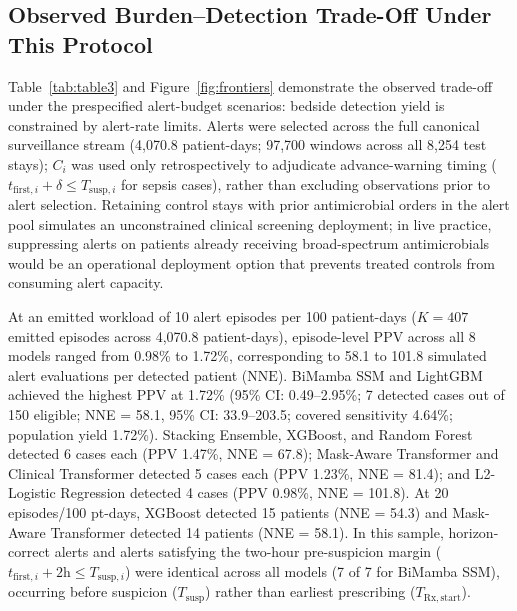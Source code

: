 \documentclass[12pt,a4paper]{article}
\begin{document}
\subsection{Observed Burden--Detection Trade-Off Under This Protocol}
Table~\ref{tab:table3} and Figure~\ref{fig:frontiers} demonstrate the observed trade-off under the prespecified alert-budget scenarios: bedside detection yield is constrained by alert-rate limits. Alerts were selected across the full canonical surveillance stream (4,070.8 patient-days; 97,700 windows across all 8,254 test stays); $C_i$ was used only retrospectively to adjudicate advance-warning timing ($t_{\mathrm{first}, i} + \delta \le T_{\mathrm{susp}, i}$ for sepsis cases), rather than excluding observations prior to alert selection. Retaining control stays with prior antimicrobial orders in the alert pool simulates an unconstrained clinical screening deployment; in live practice, suppressing alerts on patients already receiving broad-spectrum antimicrobials would be an operational deployment option that prevents treated controls from consuming alert capacity.

At an emitted workload of 10 alert episodes per 100 patient-days ($K=407$ emitted episodes across 4,070.8 patient-days), episode-level PPV across all 8 models ranged from 0.98\% to 1.72\%, corresponding to 58.1 to 101.8 simulated alert evaluations per detected patient ($\text{NNE}$). BiMamba SSM and LightGBM achieved the highest PPV at 1.72\% (95\% CI: 0.49--2.95\%; 7 detected cases out of 150 eligible; NNE = 58.1, 95\% CI: 33.9--203.5; covered sensitivity 4.64\%; population yield 1.72\%). Stacking Ensemble, XGBoost, and Random Forest detected 6 cases each (PPV 1.47\%, NNE = 67.8); Mask-Aware Transformer and Clinical Transformer detected 5 cases each (PPV 1.23\%, NNE = 81.4); and L2-Logistic Regression detected 4 cases (PPV 0.98\%, NNE = 101.8). At 20 episodes/100 pt-days, XGBoost detected 15 patients (NNE = 54.3) and Mask-Aware Transformer detected 14 patients (NNE = 58.1). In this sample, horizon-correct alerts and alerts satisfying the two-hour pre-suspicion margin ($t_{\mathrm{first}, i} + 2\text{h} \le T_{\mathrm{susp}, i}$) were identical across all models (7 of 7 for BiMamba SSM), occurring before suspicion ($T_{\mathrm{susp}}$) rather than earliest prescribing ($T_{\mathrm{Rx,start}}$).
\end{document}
